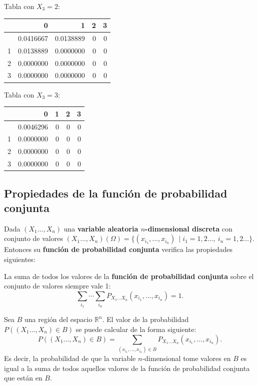 \documentclass[
  letterpaper,
  DIV=11,
  numbers=noendperiod]{scrreprt}
\begin{document}
Tabla con \(X_3=2\):

\begin{longtable}[]{@{}lrrrr@{}}
\toprule\noalign{}
& 0 & 1 & 2 & 3 \\
\midrule\noalign{}
\endhead
\bottomrule\noalign{}
\endlastfoot
0 & 0.0416667 & 0.0138889 & 0 & 0 \\
1 & 0.0138889 & 0.0000000 & 0 & 0 \\
2 & 0.0000000 & 0.0000000 & 0 & 0 \\
3 & 0.0000000 & 0.0000000 & 0 & 0 \\
\end{longtable}

Tabla con \(X_3=3\):

\begin{longtable}[]{@{}lrrrr@{}}
\toprule\noalign{}
& 0 & 1 & 2 & 3 \\
\midrule\noalign{}
\endhead
\bottomrule\noalign{}
\endlastfoot
0 & 0.0046296 & 0 & 0 & 0 \\
1 & 0.0000000 & 0 & 0 & 0 \\
2 & 0.0000000 & 0 & 0 & 0 \\
3 & 0.0000000 & 0 & 0 & 0 \\
\end{longtable}

\hypertarget{propiedades-de-la-funciuxf3n-de-probabilidad-conjunta-1}{%
\subsection{Propiedades de la función de probabilidad
conjunta}\label{propiedades-de-la-funciuxf3n-de-probabilidad-conjunta-1}}

Dada \((X_1\ldots,X_n)\) una \textbf{variable aleatoria
\(n\)-dimensional discreta} con conjunto de valores
\((X_1\ldots,X_n)(\Omega)=\{(x_{i_1},\ldots,x_{i_n})\, \mid i_1=1,2\ldots,\ i_n=1,2\ldots\}\).
Entonces su \textbf{función de probabilidad conjunta} verifica las
propiedades siguientes:

La suma de todos los valores de la \textbf{función de probabilidad
conjunta} sobre el conjunto de valores siempre vale 1:
\[\sum_{i_1}\cdots\sum_{i_n} P_{X_1\ldots X_n}(x_{i_1},\ldots,x_{i_n})=1.\]

Sea \(B\) una región del espacio \(\mathbb{R}^n\). El valor de la
probabilidad \(P((X_1\ldots,X_n)\in B)\) se puede calcular de la forma
siguiente: \[
P((X_1\ldots,X_n)\in B) =\sum_{(x_{i_1},\ldots,x_{i_n})\in B} P_{X_1\ldots X_n}(x_{i_1},\ldots,x_{i_n}).
\] Es decir, la probabilidad de que la variable \(n\)-dimensional tome
valores en \(B\) es igual a la suma de todos aquellos valores de la
función de probabilidad conjunta que están en \(B\).
\end{document}
